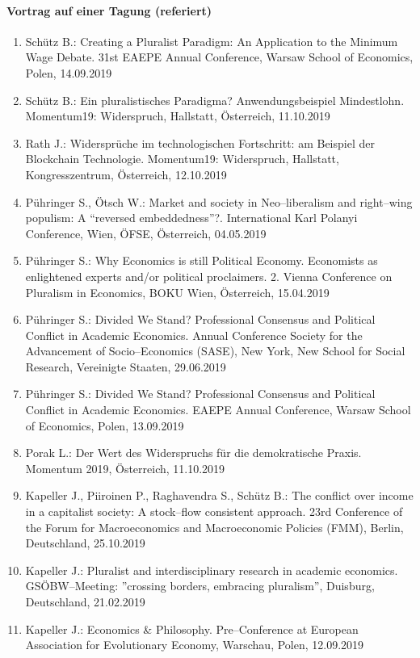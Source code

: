 \paragraph{Vortrag auf einer Tagung (referiert)}
\begin{enumerate}
	\item Schütz B.: Creating a Pluralist Paradigm: An Application to the Minimum Wage Debate. 31st EAEPE Annual Conference, Warsaw School of Economics, Polen, 14.09.2019
	\item Schütz B.: Ein pluralistisches Paradigma? Anwendungsbeispiel Mindestlohn. Momentum19: Widerspruch, Hallstatt, Österreich, 11.10.2019
	\item Rath J.: Widersprüche im technologischen Fortschritt: am Beispiel der Blockchain Technologie. Momentum19: Widerspruch, Hallstatt, Kongresszentrum, Österreich, 12.10.2019
	\item Pühringer S., Ötsch W.: Market and society in Neo--liberalism and right--wing populism: A “reversed embeddedness”?. International Karl Polanyi Conference, Wien, ÖFSE, Österreich, 04.05.2019
	\item Pühringer S.: Why Economics is still Political Economy. Economists as enlightened experts and/or political proclaimers. 2. Vienna Conference on Pluralism in Economics, BOKU Wien, Österreich, 15.04.2019
	\item Pühringer S.: Divided We Stand? Professional Consensus and Political Conflict in Academic Economics. Annual Conference Society for the Advancement of Socio--Economics (SASE), New York, New School for Social Research, Vereinigte Staaten, 29.06.2019
	\item Pühringer S.: Divided We Stand? Professional Consensus and Political Conflict in Academic Economics. EAEPE Annual Conference, Warsaw School of Economics, Polen, 13.09.2019
	\item Porak L.: Der Wert des Widerspruchs für die demokratische Praxis. Momentum 2019, Österreich, 11.10.2019
	\item Kapeller J., Piiroinen P., Raghavendra S., Schütz B.: The conflict over income in a capitalist society: A stock--flow consistent approach. 23rd Conference of the Forum for Macroeconomics and Macroeconomic Policies (FMM), Berlin, Deutschland, 25.10.2019
	\item Kapeller J.: Pluralist and interdisciplinary research in academic economics. GSÖBW--Meeting: ''crossing borders, embracing pluralism'', Duisburg, Deutschland, 21.02.2019
	\item Kapeller J.: Economics \& Philosophy. Pre--Conference at European Association for Evolutionary Economy, Warschau, Polen, 12.09.2019

\end{enumerate}
